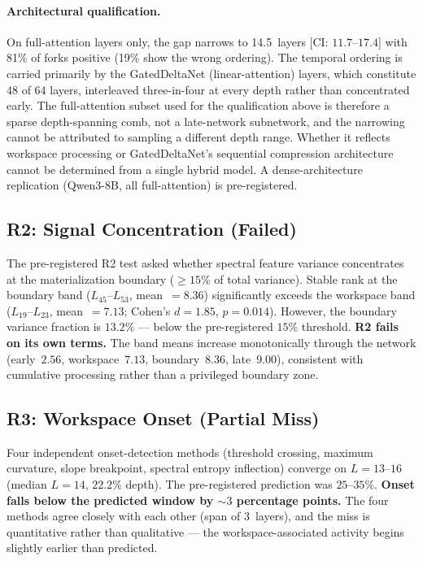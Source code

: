 \documentclass[11pt,a4paper]{article}
\begin{document}
\paragraph{Architectural qualification.} On full-attention layers only,
the gap narrows to 14.5~layers [CI: $11.7$--$17.4$] with 81\% of
forks positive (19\% show the wrong ordering). The temporal ordering
is carried primarily by the GatedDeltaNet (linear-attention) layers,
which constitute 48 of 64 layers, interleaved three-in-four at every
depth rather than concentrated early. The full-attention subset used
for the qualification above is therefore a sparse depth-spanning comb,
not a late-network subnetwork, and the narrowing cannot be attributed
to sampling a different depth range. Whether it reflects workspace
processing or GatedDeltaNet's sequential compression architecture
cannot be determined from a single hybrid model. A dense-architecture
replication (Qwen3-8B, all full-attention) is pre-registered.

\subsection{R2: Signal Concentration (Failed)}

The pre-registered R2 test asked whether spectral feature variance
concentrates at the materialization boundary (${\geq}15\%$ of total
variance). Stable rank at the boundary band ($L_{45}$--$L_{53}$,
mean~$= 8.36$) significantly exceeds the workspace band
($L_{19}$--$L_{23}$, mean~$= 7.13$; Cohen's $d{=}1.85$,
$p{=}0.014$). However, the boundary variance fraction is $13.2\%$
--- below the pre-registered $15\%$ threshold. \textbf{R2 fails on its
own terms.} The band means increase monotonically through the network
(early~$2.56$, workspace~$7.13$, boundary~$8.36$, late~$9.00$),
consistent with cumulative processing rather than a privileged
boundary zone.

\subsection{R3: Workspace Onset (Partial Miss)}

Four independent onset-detection methods (threshold crossing, maximum
curvature, slope breakpoint, spectral entropy inflection) converge on
$L{=}13$--$16$ (median $L{=}14$, $22.2\%$ depth). The pre-registered
prediction was $25$--$35\%$. \textbf{Onset falls below the predicted
window by ${\sim}3$ percentage points.} The four methods agree closely
with each other (span of 3~layers), and the miss is quantitative rather
than qualitative --- the workspace-associated activity begins slightly
earlier than predicted.
\end{document}
